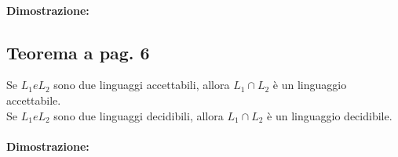 \paragraph*{Dimostrazione:}

\subsection{Teorema a pag. 6}

Se $L_{1} e L_{2}$ sono due linguaggi accettabili, allora $L_{1} \cap L_{2}$ è un linguaggio accettabile.\\
Se $L_{1} e L_{2}$ sono due linguaggi decidibili, allora $L_{1} \cap L_{2}$ è un linguaggio decidibile.

\paragraph*{Dimostrazione:}
